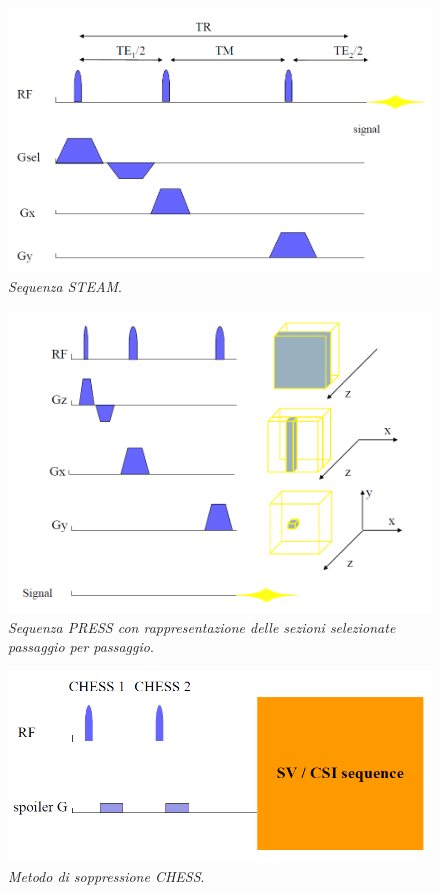 \documentclass{report}
\numberwithin{equation}{section}
\numberwithin{figure}{section}
\begin{document}
\begin{figure}[htp]
\centering
\includegraphics[scale=0.55]{immagini/steam.png}
\caption{\label{fig:steam} \textit{Sequenza STEAM}.}
\end{figure}

\begin{figure}[htp]
\centering
\includegraphics[scale=0.6]{immagini/press2.png}
\caption{\label{fig:press2} \textit{Sequenza PRESS con rappresentazione delle sezioni selezionate passaggio per passaggio}.}
\end{figure}

\begin{figure}[htp]
\centering
\includegraphics[scale=0.6]{immagini/chess.png}
\caption{\label{fig:chess} \textit{Metodo di soppressione CHESS}.}
\end{figure}
\end{document}
